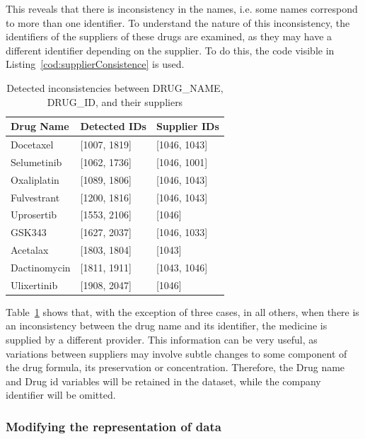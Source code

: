 This reveals that there is inconsistency in the names, i.e. some names correspond to more than one identifier. To understand the nature of this inconsistency, the identifiers of the suppliers of these drugs are examined, as they may have a different identifier depending on the supplier. To do this, the code visible in Listing~\ref{cod:supplierConsistence} is used.

\begin{table}[H]
    \centering
    \begin{tabular}{|l|l|l|}
    \hline
    \textbf{Drug Name} & \textbf{Detected IDs} & \textbf{Supplier IDs} \\ \hline
    Docetaxel & [1007, 1819] & [1046, 1043] \\ \hline
    Selumetinib & [1062, 1736] & [1046, 1001] \\ \hline
    Oxaliplatin & [1089, 1806] & [1046, 1043] \\ \hline
    Fulvestrant & [1200, 1816] & [1046, 1043] \\ \hline
    Uprosertib & [1553, 2106] & [1046] \\ \hline
    GSK343 & [1627, 2037] & [1046, 1033] \\ \hline
    Acetalax & [1803, 1804] & [1043] \\ \hline
    Dactinomycin & [1811, 1911] & [1043, 1046] \\ \hline
    Ulixertinib & [1908, 2047] & [1046] \\ \hline
    \end{tabular}
    \caption{Detected inconsistencies between DRUG\_NAME, DRUG\_ID, and their suppliers}
    \label{tab:drug_id_supplier}
\end{table}

Table~\ref{tab:drug_id_supplier} shows that, with the exception of three cases, in all others, when there is an inconsistency between the drug name and its identifier, the medicine is supplied by a different provider. This information can be very useful, as variations between suppliers may involve subtle changes to some component of the drug formula, its preservation or concentration. Therefore, the Drug name and Drug id variables will be retained in the dataset, while the company identifier will be omitted.

\subsubsection{Modifying the representation of data}

